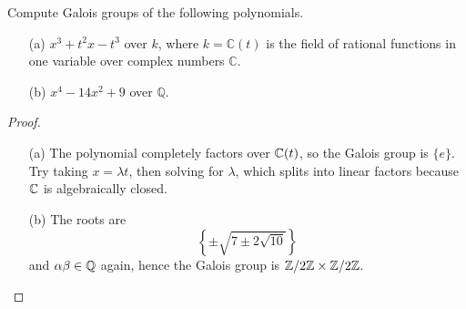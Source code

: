 \begin{prob}[S2010-Q3]
    Compute Galois groups of the following polynomials.
    \begin{itemize}
        \item[(a)] \(x^3 + t^2x - t^3\) over \(k\), where \(k = \mathbb{C}(t)\) is the field of rational functions in one variable over complex numbers \(\mathbb{C}\).
        \item[(b)] \(x^4 - 14x^2 + 9\) over \(\mathbb{Q}\).
    \end{itemize}
\end{prob}
\begin{proof}
    \begin{itemize}
        \item[(a)] The polynomial completely factors over $\mathbb{C}(t)$, so the Galois group is $\{e\}$. Try taking $x=\lambda t$, then solving for $\lambda$, which splits into linear factors because $\mathbb{C}$ is algebraically closed.
        \item[(b)] The roots are 
        \begin{equation*}
            \left\{\pm\sqrt{7\pm 2\sqrt{10}}\right\}
        \end{equation*}
        and $\alpha\beta\in\mathbb{Q}$ again, hence the Galois group is $\mathbb{Z}/2\mathbb{Z}\times\mathbb{Z}/2\mathbb{Z}$.
    \end{itemize}
\end{proof}


